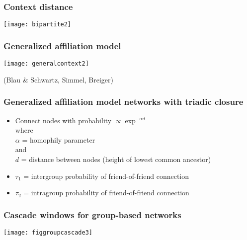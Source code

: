 \begin{frame}
  \frametitle{Context distance}
 
   \centering
   \texttt{[image: bipartite2]}
  
\end{frame}

\begin{frame}
  \frametitle{Generalized affiliation model}
 
   \centering
   \texttt{[image: generalcontext2]}
 
   (Blau \& Schwartz, Simmel, Breiger)
 
 
 

\end{frame}

\begin{frame}
  \frametitle{Generalized affiliation model networks with triadic closure}

  \begin{block}{}
    \begin{itemize}
    \item<1-> Connect nodes with probability $\propto \exp^{-\alpha d}$\\
      where\\
      $\alpha$ = homophily parameter\\
      and \\
      $d$ = distance between nodes (height of lowest common ancestor)
    \item<2->
      $\tau_1$ = intergroup probability of friend-of-friend connection
    \item<3->
      $\tau_2$ = intragroup probability of friend-of-friend connection
    \end{itemize}
  \end{block}
 
\end{frame}

\begin{frame}
  \frametitle{Cascade windows for group-based networks}

  \texttt{[image: figgroupcascade3]}\\

\end{frame}

